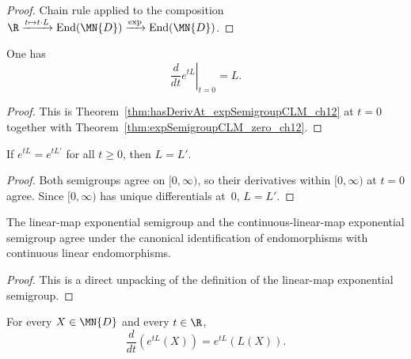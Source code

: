 \begin{proof}
    \leanok
    Chain rule applied to the composition
    $\R \xrightarrow{t \mapsto t \cdot L} \mathrm{End}(\MN{D})
        \xrightarrow{\exp} \mathrm{End}(\MN{D})$.
\end{proof}

\begin{theorem}
    \label{thm:hasDerivAt_expSemigroupCLM_zero_ch12}
    \leanok
    One has
    \[
        \left.\frac{d}{dt} e^{tL}\right|_{t=0} = L.
    \]
\end{theorem}

\begin{proof}
    \leanok
    This is Theorem~\ref{thm:hasDerivAt_expSemigroupCLM_ch12} at $t=0$ together with
    Theorem~\ref{thm:expSemigroupCLM_zero_ch12}.
\end{proof}

\begin{theorem}\label{thm:generator_unique_ch12}
    \leanok
    If $e^{tL} = e^{tL'}$ for all $t \ge 0$, then $L = L'$.
\end{theorem}

\begin{proof}
    \leanok
    Both semigroups agree on $[0,\infty)$, so their derivatives within
    $[0,\infty)$ at $t=0$ agree.
    Since $[0,\infty)$ has unique differentials at~$0$, $L = L'$.
\end{proof}

\begin{theorem}
    \label{thm:expSemigroup_toCLM_ch12}
    \leanok
    The linear-map exponential semigroup and the continuous-linear-map exponential
    semigroup agree under the canonical identification of endomorphisms with continuous
    linear endomorphisms.
\end{theorem}

\begin{proof}
    \leanok
    This is a direct unpacking of the definition of the linear-map exponential semigroup.
\end{proof}

\begin{theorem}
    \label{thm:hasDerivAt_expSemigroup_apply_ch12}
    \leanok
    For every $X \in \MN{D}$ and every $t \in \R$,
    \[
        \frac{d}{dt}(e^{tL}(X)) = e^{tL}(L(X)).
    \]
\end{theorem}

